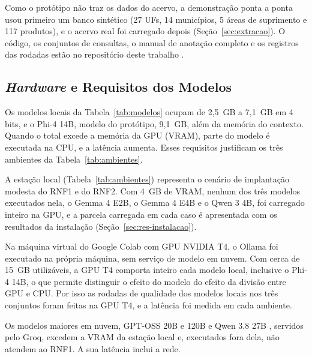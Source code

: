 Como o protótipo não traz os dados do acervo, a demonstração ponta a ponta usou primeiro um banco sintético (27 UFs, 14 municípios, 5 áreas de suprimento e 117 produtos), e o acervo real foi carregado depois (Seção~\ref{sec:extracao}). O código, os conjuntos de consultas, o manual de anotação completo e os registros das rodadas estão no repositório deste trabalho \cite{correa2026pfcbusca}.

\subsection{\textit{Hardware} e Requisitos dos Modelos}
\label{sec:hardware}

Os modelos locais da Tabela~\ref{tab:modelos} ocupam de 2,5~GB a 7,1~GB em 4 bits, e o Phi-4 14B, modelo do protótipo, 9,1~GB, além da memória do contexto. Quando o total excede a memória da GPU (VRAM), parte do modelo é executada na CPU, e a latência aumenta. Esses requisitos justificam os três ambientes da Tabela~\ref{tab:ambientes}.

A estação local (Tabela~\ref{tab:ambientes}) representa o cenário de implantação modesta do RNF1 e do RNF2. Com 4~GB de VRAM, nenhum dos três modelos executados nela, o Gemma 4 E2B, o Gemma 4 E4B e o Qwen 3 4B, foi carregado inteiro na GPU, e a parcela carregada em cada caso é apresentada com os resultados da instalação (Seção~\ref{sec:res-instalacao}).

Na máquina virtual do Google Colab com GPU NVIDIA T4, o Ollama foi executado na própria máquina, sem serviço de modelo em nuvem. Com cerca de 15~GB utilizáveis, a GPU T4 comporta inteiro cada modelo local, inclusive o Phi-4 14B, o que permite distinguir o efeito do modelo do efeito da divisão entre GPU e CPU. Por isso as rodadas de qualidade dos modelos locais nos três conjuntos foram feitas na GPU T4, e a latência foi medida em cada ambiente.

Os modelos maiores em nuvem, GPT-OSS 20B e 120B \cite{openai2025gptoss} e Qwen 3.8 27B \cite{qwen2026qwen38}, servidos pelo Groq, excedem a VRAM da estação local e, executados fora dela, não atendem ao RNF1. A sua latência inclui a rede.

